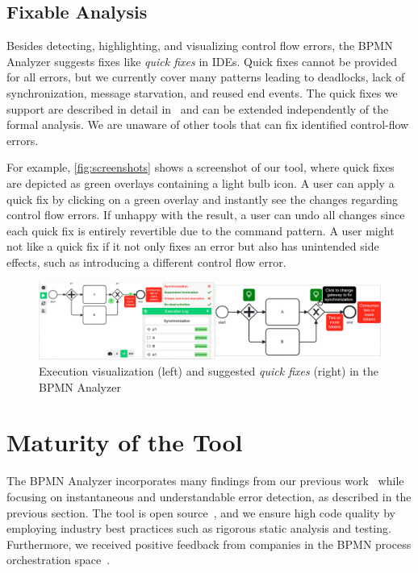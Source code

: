 \documentclass[onecolumn]{ceurart}
\begin{document}
\subsection{Fixable Analysis}
Besides detecting, highlighting, and visualizing control flow errors, the BPMN Analyzer suggests fixes like \textit{quick fixes} in IDEs.
Quick fixes cannot be provided for all errors, but we currently cover many patterns leading to deadlocks, lack of synchronization, message starvation, and reused end events.
The quick fixes we support are described in detail in~\cite{krauterInstantaneousComprehensibleFixable2024} and can be extended independently of the formal analysis.
We are unaware of other tools that can fix identified control-flow errors.

For example, \autoref{fig:screenshots} shows a screenshot of our tool, where quick fixes are depicted as green overlays containing a light bulb icon.
A user can apply a quick fix by clicking on a green overlay and instantly see the changes regarding control flow errors.
If unhappy with the result, a user can undo all changes since each quick fix is entirely revertible due to the command pattern.
A user might not like a quick fix if it not only fixes an error but also has unintended side effects, such as introducing a different control flow error.

\begin{figure}[ht]
	\centering
	\includegraphics[width=1\linewidth]{images/tool-screenshots}
	\caption{Execution visualization (left) and suggested \textit{quick fixes} (right) in the BPMN Analyzer}
	\label{fig:screenshots}
\end{figure}

\section{Maturity of the Tool} \label{sec:maturity}
The BPMN Analyzer incorporates many findings from our previous work~\cite{krauterHigherorderTransformationApproach2024} while focusing on instantaneous and understandable error detection, as described in the previous section.
The tool is open source~\cite{krauterInstantaneousComprehensibleFixable2024}, and we ensure high code quality by employing industry best practices such as rigorous static analysis and testing.
Furthermore, we received positive feedback from companies in the BPMN process orchestration space~\cite{krauterInstantaneousComprehensibleFixable2024}.
\end{document}
